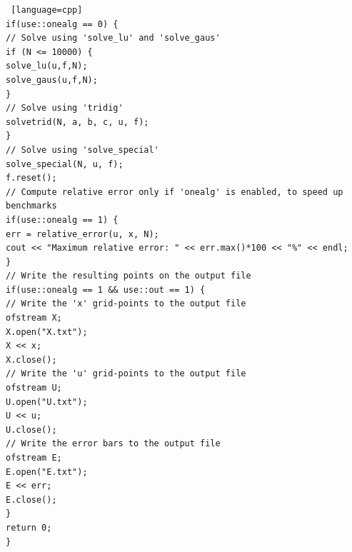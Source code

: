 \documentclass {article}
\begin{document}
\begin{lstlisting} [language=cpp]
if(use::onealg == 0) {
// Solve using 'solve_lu' and 'solve_gaus'
if (N <= 10000) {
solve_lu(u,f,N);
solve_gaus(u,f,N);
}
// Solve using 'tridig'
solvetrid(N, a, b, c, u, f);
}
// Solve using 'solve_special'
solve_special(N, u, f);
f.reset();
// Compute relative error only if 'onealg' is enabled, to speed up benchmarks
if(use::onealg == 1) {
err = relative_error(u, x, N);
cout << "Maximum relative error: " << err.max()*100 << "%" << endl;
}
// Write the resulting points on the output file
if(use::onealg == 1 && use::out == 1) {
// Write the 'x' grid-points to the output file
ofstream X;
X.open("X.txt");
X << x;
X.close();
// Write the 'u' grid-points to the output file
ofstream U;
U.open("U.txt");
U << u;
U.close();
// Write the error bars to the output file
ofstream E;
E.open("E.txt");
E << err;
E.close();
}
return 0;
}
\end{lstlisting}
\end{document}
